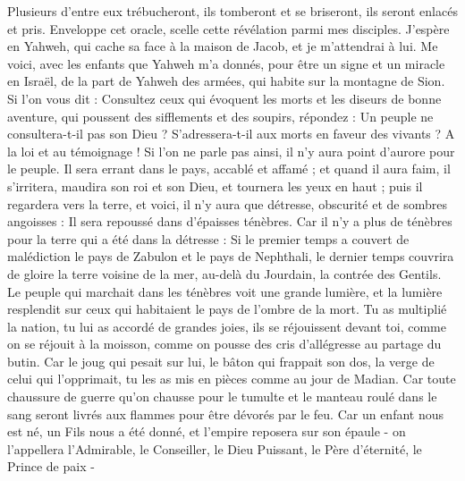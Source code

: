 \begin{multicols}{2}
Plusieurs d'entre eux trébucheront, ils tomberont et se briseront, ils seront enlacés et pris.
Enveloppe cet oracle, scelle cette révélation parmi mes disciples.
J'espère en Yahweh, qui cache sa face à la maison de Jacob, et je m'attendrai à lui.
Me voici, avec les enfants que Yahweh m'a donnés, pour être un signe et un miracle en Israël, de la part de Yahweh des armées, qui habite sur la montagne de Sion.
Si l'on vous dit : Consultez ceux qui évoquent les morts et les diseurs de bonne aventure, qui poussent des sifflements et des soupirs, répondez : Un peuple ne consultera-t-il pas son Dieu ? S'adressera-t-il aux morts en faveur des vivants ?
A la loi et au témoignage ! Si l'on ne parle pas ainsi, il n'y aura point d'aurore pour le peuple.
Il sera errant dans le pays, accablé et affamé ; et quand il aura faim, il s'irritera, maudira son roi et son Dieu, et tournera les yeux en haut ;
puis il regardera vers la terre, et voici, il n'y aura que détresse, obscurité et de sombres angoisses : Il sera repoussé dans d'épaisses ténèbres.
Car il n'y a plus de ténèbres pour la terre qui a été dans la détresse : Si le premier temps a couvert de malédiction le pays de Zabulon et le pays de Nephthali, le dernier temps couvrira de gloire la terre voisine de la mer, au-delà du Jourdain, la contrée des Gentils.
\VerseOne{}Le peuple qui marchait dans les ténèbres voit une grande lumière, et la lumière resplendit sur ceux qui habitaient le pays de l'ombre de la mort.
Tu as multiplié la nation, tu lui as accordé de grandes joies, ils se réjouissent devant toi, comme on se réjouit à la moisson, comme on pousse des cris d'allégresse au partage du butin.
Car le joug qui pesait sur lui, le bâton qui frappait son dos, la verge de celui qui l'opprimait, tu les as mis en pièces comme au jour de Madian.
Car toute chaussure de guerre qu'on chausse pour le tumulte et le manteau roulé dans le sang seront livrés aux flammes pour être dévorés par le feu.
Car un enfant nous est né, un Fils nous a été donné, et l'empire reposera sur son épaule - on l'appellera l'Admirable, le Conseiller, le Dieu Puissant, le Père d'éternité, le Prince de paix -

\end{multicols}
